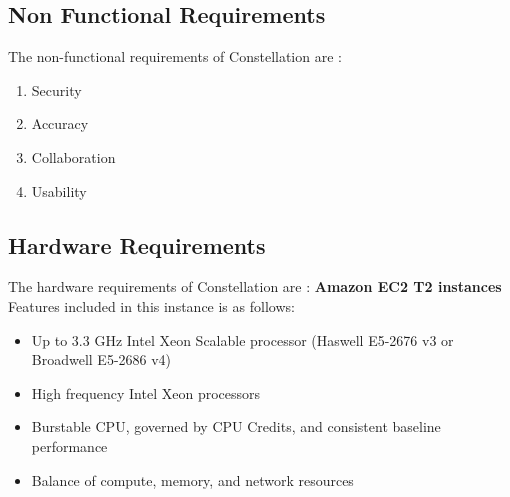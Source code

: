 \documentclass[12pt,a4paper]{report}     %
\begin{document}
\begin{normalsize}
{\subsection{Non Functional Requirements}
The non-functional requirements of Constellation are :
\begin{enumerate}
\item Security
\item Accuracy
\item Collaboration
\item Usability
\end{enumerate}
\subsection{Hardware Requirements}
The hardware requirements of Constellation are :
\newline
\textbf{Amazon EC2 T2 instances}
\newline Features included in this instance is as follows:
\begin{itemize}
    \item Up to 3.3 GHz Intel Xeon Scalable processor (Haswell E5-2676 v3 or Broadwell E5-2686 v4)
    \item High frequency Intel Xeon processors
    \item Burstable CPU, governed by CPU Credits, and consistent baseline performance
    \item Balance of compute, memory, and network resources
\end{itemize}
}
\end{normalsize}
\end{document}
